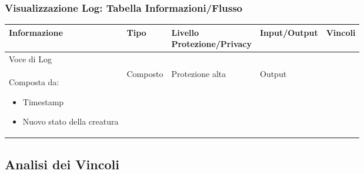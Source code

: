 \documentclass[a4paper, 11pt]{article}
\let\newline\\
\begin{document}
\subsubsection*{Visualizzazione Log: Tabella Informazioni/Flusso}
\begin{adjustwidth}{-1.5cm}{-1.5cm}
\begin{center}
    \begin{tabular}{|p{3cm}|p{1.5cm}|p{3.5cm}|p{2.5cm}|p{4cm}|}
        \hline
        \textbf{Informazione} & \textbf{Tipo} & \textbf{Livello \newline Protezione/Privacy} & \textbf{Input/Output}&\textbf{Vincoli}\\
        \hline
        Voce di Log \newline Composta da: \begin{itemize}
            \item Timestamp
            \item Nuovo stato della creatura
        \end{itemize} & Composto & Protezione alta & Output & \\\hline
    \end{tabular}
\end{center}
\end{adjustwidth}

\clearpage
\newpage
\subsection{Analisi dei Vincoli}
\end{document}
